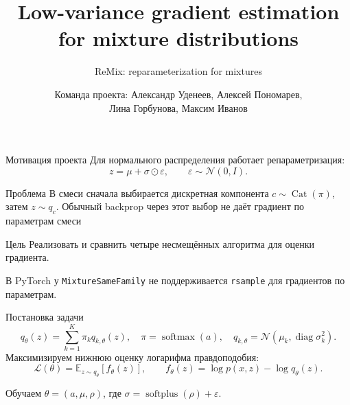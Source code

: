 \documentclass[aspectratio=169]{beamer}
\title{Low-variance gradient estimation for mixture distributions}
\subtitle{ReMix: reparameterization for mixtures}
\author{Команда проекта: Александр Уденеев, Алексей Пономарев,\\Лина Горбунова, Максим Иванов}
\institute{ИАД, МФТИ}
\date{\empty}
\newcommand{\E}{\mathbb E}
\begin{document}
\begin{frame}
  \thispagestyle{empty}
  \maketitle
\end{frame}


\begin{frame}{Мотивация проекта}
  Для нормального распределения работает репараметризация:
  \[
    z=\mu+\sigma\odot\varepsilon,\qquad \varepsilon\sim\mathcal N(0,I).
  \]
  \begin{block}{Проблема}
    В смеси сначала выбирается дискретная компонента
    $c\sim\operatorname{Cat}(\pi)$, затем $z\sim q_c$.
    Обычный backprop через этот выбор не даёт градиент по параметрам смеси
  \end{block}
  \begin{block}{Цель}
    Реализовать и сравнить четыре несмещённых алгоритма для оценки градиента.
  \end{block}
  В PyTorch у \texttt{MixtureSameFamily} не поддерживается \texttt{rsample} для градиентов по параметрам.
\end{frame}

\begin{frame}{Постановка задачи}
  \[
    q_\theta(z)=\sum_{k=1}^{K}\pi_kq_{k,\theta}(z),\quad
    \pi=\operatorname{softmax}(a),\quad
    q_{k,\theta}=\mathcal N(\mu_k,\operatorname{diag}\sigma_k^2).
  \]
  Максимизируем нижнюю оценку логарифма правдоподобия:
  \[
    \mathcal L(\theta)=\E_{z\sim q_\theta}[f_\theta(z)],
    \qquad f_\theta(z)=\log p(x,z)-\log q_\theta(z).
  \]

  Обучаем $\theta=(a,\mu,\rho)$, где $\sigma=\operatorname{softplus}(\rho)+\varepsilon$.
\end{frame}
\end{document}
